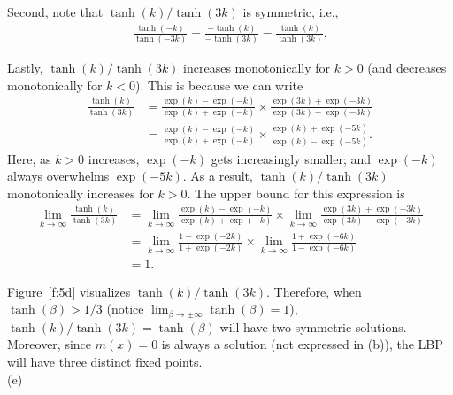 \documentclass{article}
\newcommand{\qeds}{\hfill\qedsymbol}
\begin{document}
Second, note that $\tanh(k)/\tanh(3k)$ is symmetric, i.e., 
\begin{align*}
	\frac{\tanh(-k)}{\tanh(-3k)} = \frac{-\tanh(k)}{-\tanh(3k)} = \frac{\tanh(k)}{\tanh(3k)}.
\end{align*}

Lastly, $\tanh(k)/\tanh(3k)$ increases monotonically for $k>0$ (and decreases monotonically for $k<0$).
This is  because we can write
\begin{align*}
	\frac{\tanh(k)}{\tanh(3k)} &= \frac{\exp(k) - \exp(-k)}{\exp(k) + \exp(-k)}
	\times\frac{\exp(3k) + \exp(-3k)}{\exp(3k) - \exp(-3k)}\\
	&=\frac{\exp(k) - \exp(-k)}{\exp(k) + \exp(-k)}\times
	\frac{\exp(k) + \exp(-5k)}{\exp(k) - \exp(-5k)}.
\end{align*}
Here, as $k>0$ increases, $\exp(-k)$ gets increasingly smaller; and $\exp(-k)$ always overwhelms $\exp(-5k)$.
As a result, $\tanh(k)/\tanh(3k)$ monotonically increases for $k>0$. The upper bound for this expression is
\begin{align*}
	\lim_{k\to\infty}\frac{\tanh(k)}{\tanh(3k)} &= 
	\lim_{k\to\infty}\frac{\exp(k) - \exp(-k)}{\exp(k) + \exp(-k)}
	\times\lim_{k\to\infty}\frac{\exp(3k) + \exp(-3k)}{\exp(3k) - \exp(-3k)}\\
	&= \lim_{k\to\infty}\frac{1 - \exp(-2k)}{1 + \exp(-2k)}
	\times\lim_{k\to\infty}\frac{1 + \exp(-6k)}{1 - \exp(-6k)}\\
	&= 1.
\end{align*}

Figure~\ref{f:5d} visualizes $\tanh(k)/\tanh(3k)$. Therefore, when $\tanh(\beta) > 1/3$ (notice 
$\lim_{\beta\to\pm\infty}\tanh(\beta)=1$), $\tanh(k)/\tanh(3k) = \tanh(\beta)$ will have two
symmetric solutions. Moreover, since $m(x) = 0$ is always a solution (not expressed in (b)),
the LBP will have three distinct fixed points. \qeds
\\

\noindent
(e)
\end{document}
